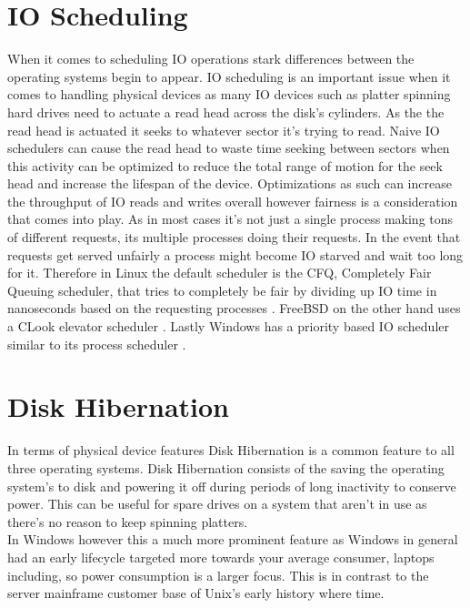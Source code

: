 \documentclass[letterpaper,10pt,draftclsnofoot,onecolumn]{IEEEtran}
\begin{document}
\section{IO Scheduling}
When it comes to scheduling IO operations stark differences between the operating systems begin to appear. IO scheduling is an important issue when it comes to handling physical devices as many IO devices such as platter spinning hard drives need to actuate a read head across the disk’s cylinders. As the the read head is actuated it seeks to whatever sector it’s trying to read. Naive IO schedulers can cause the read head to waste time seeking between sectors when this activity can be optimized to reduce the total range of motion for the seek head and increase the lifespan of the device. Optimizations as such can increase the throughput of IO reads and writes overall however fairness is a consideration that comes into play. As in most cases it’s not just a single process making tons of different requests, its multiple processes doing their requests. In the event that requests get served unfairly a process might become IO starved and wait too long for it. Therefore in Linux the default scheduler is the CFQ, Completely Fair Queuing scheduler, that tries to completely be fair by dividing up IO time in nanoseconds based on the requesting processes \cite{love}. FreeBSD on the other hand uses a CLook elevator scheduler \cite{mccusick}. Lastly Windows has a priority based IO scheduler similar to its process scheduler \cite{russinovich}.\\

\section{Disk Hibernation}
In terms of physical device features Disk Hibernation is a common feature to all three operating systems. Disk Hibernation consists of the saving the operating system’s to disk and powering it off during periods of long inactivity to conserve power. This can be useful for spare drives on a system that aren’t in use as there’s no reason to keep spinning platters.\\

In Windows however this a much more prominent feature as Windows in general had an early lifecycle targeted more towards your average consumer, laptops including, so power consumption is a larger focus. This is in contrast to the server mainframe customer base of Unix’s early history where time.\\
\newpage
\end{document}
